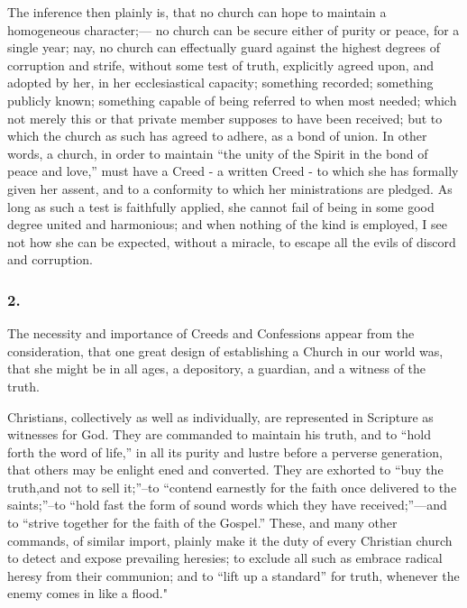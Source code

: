 \documentclass[
]{book}
\begin{document}
The inference then plainly is, that no church can hope to maintain a homogeneous character;--- no church can be secure either of purity or peace, for a single year; nay, no church can effectually guard against the highest degrees of corruption and strife, without some test of truth, explicitly agreed upon, and adopted by her, in her ecclesiastical capacity; something recorded; something publicly known; something capable of being referred to when most needed; which not merely this or that private member supposes to have been received; but to which the church as such has agreed to adhere, as a bond of union. In other words, a church, in order to maintain ``the unity of the Spirit in the bond of peace and love,'' must have a Creed - a written Creed - to which she has formally given her assent, and to a conformity to which her ministrations are pledged. As long as such a test is faithfully applied, she cannot fail of being in some good degree united and harmonious; and when nothing of the kind is employed, I see not how she can be expected, without a miracle, to escape all the evils of discord and corruption.

\hypertarget{section-1}{%
\subsubsection*{2.}\label{section-1}}

The necessity and importance of Creeds and Confessions appear from the consideration, that one great design of establishing a Church in our world was, that she might be in all ages, a depository, a guardian, and a witness of the truth.

Christians, collectively as well as individually, are represented in Scripture as witnesses for God. They are commanded to maintain his truth, and to ``hold forth the word of life,'' in all its purity and lustre before a perverse generation, that others may be enlight ened and converted. They are exhorted to ``buy the truth,and not to sell it;''--to ``contend earnestly for the faith once delivered to the saints;''--to ``hold fast the form of sound words which they have received;''---and to ``strive together for the faith of the Gospel.'' These, and many other commands, of similar import, plainly make it the duty of every Christian church to detect and expose prevailing heresies; to exclude all such as embrace radical heresy from their communion; and to ``lift up a standard'' for truth, whenever the enemy comes in like a flood."
\end{document}
